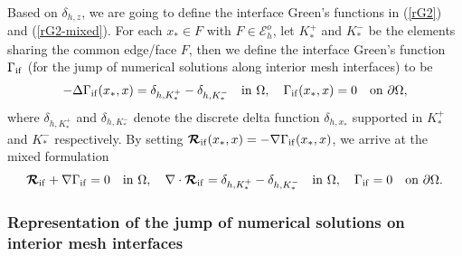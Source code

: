 \documentclass[1996/10/24]{amsart}
\theoremstyle{definition}
\numberwithin{equation}{section}
\begin{document}
Based on $\delta_{h,z}$, we are going to define the interface Green's functions in (\ref{rG2}) and (\ref{rG2-mixed}).
For each $x_{\ast}\in F$ with $F\in\mathcal{E}_h^o$, let $K_{\ast}^+$ and $K_{\ast}^-$
be the elements sharing the common edge/face $F$, then we define the interface Green's function $\Gamma_{{\rm if}}$
(for the jump of numerical solutions along interior mesh interfaces) to be
\begin{align}
-\Delta\Gamma_{{\rm if}}(x_{\ast},x)=\delta_{h,K_{\ast}^+}-\delta_{h,K_{\ast}^-}\quad {\rm in}~\Omega,\quad \Gamma_{{\rm if}}(x_{\ast},x)=0\quad {\rm on}~\partial\Omega,\label{rG2}
\end{align}
where $\delta_{h,K_{\ast}^+}$ and $\delta_{h,K_{\ast}^-}$ denote the discrete delta function $\delta_{h,x_{\ast}}$ supported in $K_{\ast}^+$ and $K_{\ast}^-$
respectively. By setting $\boldsymbol{\mathcal{R}}_{{\rm if}}(x_{\ast},x)=-\nabla\Gamma_{{\rm if}}(x_{\ast},x)$, we arrive at the mixed formulation
\begin{align}
\boldsymbol{\mathcal{R}}_{{\rm if}}+\nabla\Gamma_{{\rm if}}=0\quad {\rm in}~\Omega,\quad
\nabla\cdot\boldsymbol{\mathcal{R}}_{{\rm if}}=\delta_{h,K_{\ast}^+}-\delta_{h,K_{\ast}^-}\quad {\rm in}~\Omega,\quad
\Gamma_{{\rm if}}=0\quad {\rm on}~\partial\Omega.\label{rG2-mixed}
\end{align}

\subsubsection{Representation of the jump of numerical solutions on interior mesh interfaces}
\label{sec3:3.3}
\end{document}
